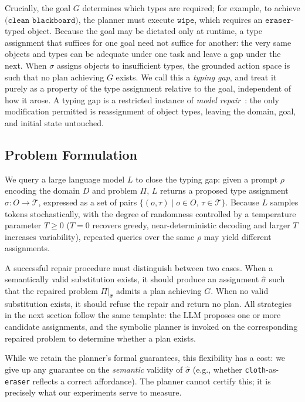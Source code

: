 Crucially, the goal $G$ determines which types are required; for example, to achieve $\texttt{(clean blackboard)}$, the planner must execute $\texttt{wipe}$, which requires an $\texttt{eraser}$-typed object. Because the goal may be dictated only at runtime, a type assignment that suffices for one goal need not suffice for another: the very same objects and types can be adequate under one task and leave a gap under the next. When $\sigma$ assigns objects to insufficient types, the grounded action space is such that no plan achieving $G$ exists. We call this a \textit{typing gap}, and treat it purely as a property of the type assignment relative to the goal, independent of how it arose. A typing gap is a restricted instance of \emph{model repair}~\cite{bercher2025modelrepair}: the only modification permitted is reassignment of object types, leaving the domain, goal, and initial state untouched.

\subsection{Problem Formulation}
\label{subsec:llm_query}

We query a large language model $L$ to close the typing gap: given a prompt $\rho$ encoding the domain $D$ and problem $\Pi$, $L$ returns a proposed type assignment $\hat{\sigma} : O \rightarrow \mathcal{T}$, expressed as a set of pairs $\{(o, \tau) \mid o \in O,\, \tau \in \mathcal{T}\}$. Because $L$ samples tokens stochastically, with the degree of randomness controlled by a temperature parameter $T \ge 0$ ($T{=}0$ recovers greedy, near-deterministic decoding and larger $T$ increases variability), repeated queries over the same $\rho$ may yield different assignments.


A successful repair procedure must distinguish between two cases. When a semantically valid substitution exists, it should produce an assignment $\hat{\sigma}$ such that the repaired problem $\Pi|_{\hat{\sigma}}$ admits a plan achieving $G$. When no valid substitution exists, it should refuse the repair and return no plan. All strategies in the next section follow the same template: the LLM proposes one or more candidate assignments, and the symbolic planner is invoked on the corresponding repaired problem to determine whether a plan exists.

While we retain the planner's formal guarantees, this flexibility has a cost: we give up any guarantee on the \emph{semantic} validity of $\hat{\sigma}$ (e.g., whether \texttt{cloth}-as-\texttt{eraser} reflects a correct affordance). The planner cannot certify this; it is precisely what our experiments serve to measure.
